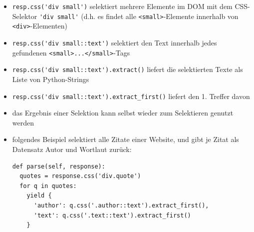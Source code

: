 \documentclass{beamer}
\begin{document}
\begin{frame}
	
	\framebreak
	
	\begin{itemize}
		\item \lstinline|resp.css('div small')| selektiert mehrere Elemente im DOM
		mit dem CSS-Selektor \lstinline|'div small'| (d.h. es findet alle \lstinline|<small>|-Elemente innerhalb von \lstinline|<div>|-Elementen)
		\item \lstinline|resp.css('div small::text')| selektiert den Text innerhalb jedes gefundenen \lstinline|<small>...</small>|-Tags
		\item \lstinline|resp.css('div small::text').extract()| liefert die selektierten Texte als Liste von Python-Strings
		\item \lstinline|resp.css('div small::text').extract_first()| liefert den 1. Treffer davon
	\end{itemize}
	
	\framebreak
	
	\begin{itemize}
		\item das Ergebnis einer Selektion kann selbst wieder zum Selektieren genutzt werden
		\item folgendes Beispiel selektiert alle Zitate einer Website, und gibt je Zitat als Datensatz Autor und Wortlaut zurück:
	\begin{lstlisting}
def parse(self, response):
  quotes = response.css('div.quote')
  for q in quotes:
    yield {
      'author': q.css('.author::text').extract_first(),
      'text': q.css('.text::text').extract_first()
    }
	\end{lstlisting}
	\end{itemize}
\end{frame}
\end{document}
